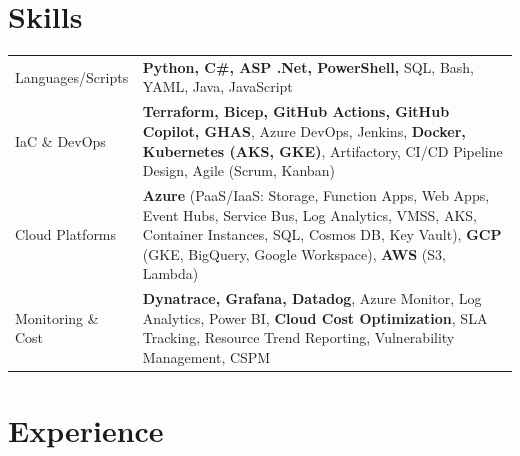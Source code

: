 \documentclass[a4paper,3pt]{article}
\begin{document}
\section{Skills}
\begin{tabularx}{\linewidth}{@{}l X@{}}
    Languages/Scripts  & \normalsize{\textbf{Python, C\#, ASP .Net, PowerShell,} SQL, Bash, YAML, Java, JavaScript}\\
    IaC \& DevOps      & \normalsize{\textbf{Terraform, Bicep, GitHub Actions, GitHub Copilot, GHAS}, Azure DevOps, Jenkins, \textbf{Docker, Kubernetes (AKS, GKE)}, Artifactory, CI/CD Pipeline Design, Agile (Scrum, Kanban)}\\
    Cloud Platforms    & \normalsize{\textbf{Azure} (PaaS/IaaS: Storage, Function Apps, Web Apps, Event Hubs, Service Bus, Log Analytics, VMSS, AKS, Container Instances, SQL, Cosmos DB, Key Vault), \textbf{GCP} (GKE, BigQuery, Google Workspace), \textbf{AWS} (S3, Lambda)}\\
    Monitoring \& Cost & \normalsize{\textbf{Dynatrace, Grafana, Datadog}, Azure Monitor, Log Analytics, Power BI, \textbf{Cloud Cost Optimization}, SLA Tracking, Resource Trend Reporting, Vulnerability Management, CSPM}
\end{tabularx}


\section{Experience}
\end{document}
